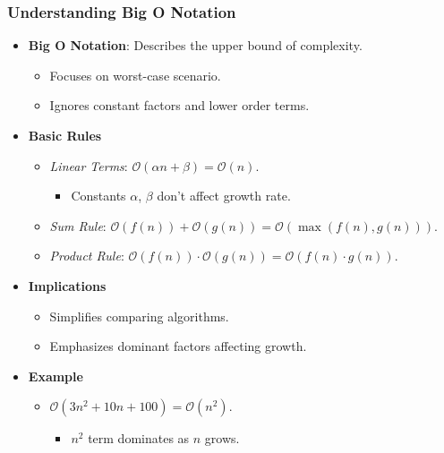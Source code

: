 \documentclass[compress,12pt,bookmark]{beamer}
\begin{document}
\begin{frame}
    \frametitle{Understanding Big O Notation}

    \begin{itemize}
        \item \textbf{Big O Notation}: Describes the upper bound of complexity.
              \begin{itemize}
                  \item Focuses on worst-case scenario.
                  \item Ignores constant factors and lower order terms.
              \end{itemize}
        \item \textbf{Basic Rules}
              \begin{itemize}
                  \item \textit{Linear Terms}: $\mathcal{O}(\alpha n + \beta) = \mathcal{O}(n)$.
                        \begin{itemize}
                            \item Constants $\alpha$, $\beta$ don't affect growth rate.
                        \end{itemize}
                  \item \textit{Sum Rule}: $\mathcal{O}(f(n)) + \mathcal{O}(g(n)) = \mathcal{O}(\max(f(n), g(n)))$.
                  \item \textit{Product Rule}: $\mathcal{O}(f(n)) \cdot \mathcal{O}(g(n)) = \mathcal{O}(f(n) \cdot g(n))$.
              \end{itemize}
        \item \textbf{Implications}
              \begin{itemize}
                  \item Simplifies comparing algorithms.
                  \item Emphasizes dominant factors affecting growth.
              \end{itemize}
        \item \textbf{Example}
              \begin{itemize}
                  \item $\mathcal{O}(3n^2 + 10n + 100) = \mathcal{O}(n^2)$.
                        \begin{itemize}
                            \item $n^2$ term dominates as $n$ grows.
                        \end{itemize}
              \end{itemize}
    \end{itemize}
\end{frame}
\end{document}
